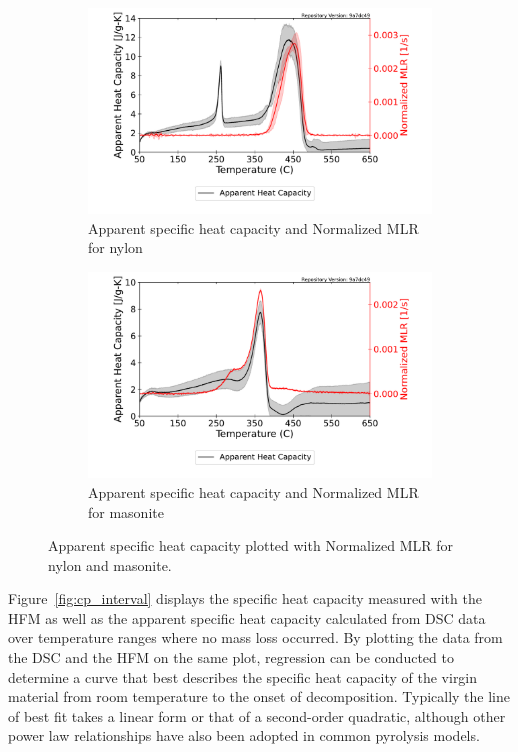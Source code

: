 \documentclass[12pt,oneside]{book}
\begin{document}
\begin{figure}[H]
    \centering
    \begin{subfigure}[b]{0.475\textwidth}
        \centering
        \includegraphics[width=\textwidth]{Figures/Nylon_10K_cp.pdf}
        \caption{Apparent specific heat capacity and Normalized MLR for nylon}
    \end{subfigure}
    \hfill
    \begin{subfigure}[b]{0.475\textwidth}
        \centering
        \includegraphics[width=\textwidth]{Figures/Masonite_Board_10K_cp.pdf}
        \caption{Apparent specific heat capacity and Normalized MLR for masonite}
    \end{subfigure}
    \caption[Apparent Specific Heat Capacity Plotted with Normalized MLR] {Apparent specific heat capacity plotted with Normalized MLR for nylon and masonite.} 
    \label{fig:cp_full}
\end{figure}

Figure~\ref{fig:cp_interval} displays the specific heat capacity measured with the HFM as well as the apparent specific heat capacity calculated from DSC data over temperature ranges where no mass loss occurred. By plotting the data from the DSC and the HFM on the same plot, regression can be conducted to determine a curve that best describes the specific heat capacity of the virgin material from room temperature to the onset of decomposition. Typically the line of best fit takes a linear form or that of a second-order quadratic, although other power law relationships have also been adopted in common pyrolysis models.
\end{document}
